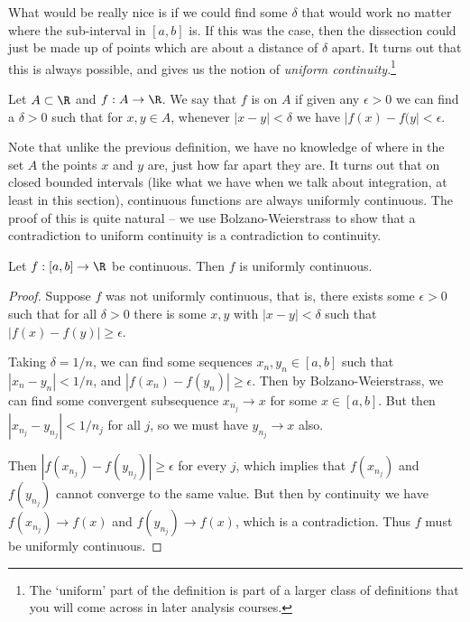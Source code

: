What would be really nice is if we could find some $\delta$ that would work no matter where the sub-interval in $[a, b]$ is. If this was the case, then the dissection could just be made up of points which are about a distance of $\delta$ apart. It turns out that this is always possible, and gives us the notion of \emph{uniform continuity}.\footnote{The `uniform' part of the definition is part of a larger class of definitions that you will come across in later analysis courses.}

\begin{definition}
	Let $A \subset \R$ and $f: A \rightarrow \R$. We say that $f$ is  on $A$ if given any $\epsilon  >0$ we can find a $\delta> 0$ such that for $x, y \in A$, whenever $|x - y| < \delta$ we have $|f(x) - f(y| < \epsilon$.
\end{definition}

Note that unlike the previous definition, we have no knowledge of where in the set $A$ the points $x$ and $y$ are, just how far apart they are. It turns out that on closed bounded intervals (like what we have when we talk about integration, at least in this section), continuous functions are always uniformly continuous.
The proof of this is quite natural -- we use Bolzano-Weierstrass to show that a contradiction to uniform continuity is a contradiction to continuity.

\begin{theorem}
	Let $f: [a, b] \rightarrow \R$ be continuous. Then $f$ is uniformly continuous.
\end{theorem}
\begin{proof}
	Suppose $f$ was not uniformly continuous, that is, there exists some $\epsilon > 0$ such that for all $\delta > 0$ there is some $x, y$ with $|x - y| < \delta$ such that $|f(x) - f(y)| \geq \epsilon$.

	Taking $\delta = 1/n$, we can find some sequences $x_n, y_n \in [a, b]$ such that $|x_n - y_n| < 1/n$, and $|f(x_n) - f(y_n)| \geq \epsilon$. Then by Bolzano-Weierstrass, we can find some convergent subsequence $x_{n_j} \rightarrow x$ for some $x \in [a, b]$. But then $|x_{n_j} - y_{n_j}| < 1/n_j$ for all $j$, so we must have $y_{n_j} \rightarrow x$ also.

	Then $|f(x_{n_j}) - f(y_{n_j})| \geq \epsilon$ for every $j$, which implies that $f(x_{n_j})$ and $f(y_{n_j})$ cannot converge to the same value. But then by continuity we have $f(x_{n_j}) \rightarrow f(x)$ and $f(y_{n_j}) \rightarrow f(x)$, which is a contradiction. Thus $f$ must be uniformly continuous.
\end{proof}

